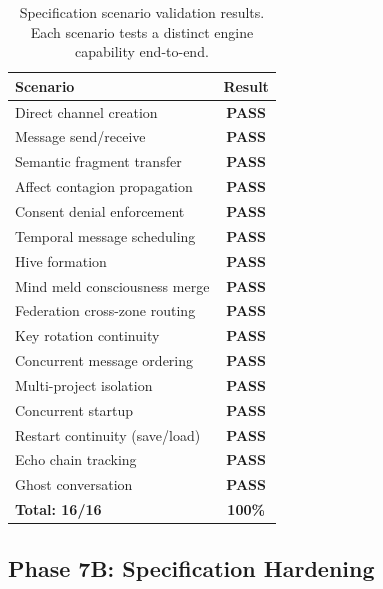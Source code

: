 \documentclass[10pt, twocolumn]{article}
\begin{document}
\begin{table}[t]
\caption{Specification scenario validation results. Each scenario tests a distinct engine capability end-to-end.}
\label{tab:scenarios}
\centering
\scriptsize
\begin{tabular}{@{}lc@{}}
\toprule
\textbf{Scenario} & \textbf{Result} \\
\midrule
Direct channel creation & \textcolor{amgreen}{\textbf{PASS}} \\
Message send/receive & \textcolor{amgreen}{\textbf{PASS}} \\
Semantic fragment transfer & \textcolor{amgreen}{\textbf{PASS}} \\
Affect contagion propagation & \textcolor{amgreen}{\textbf{PASS}} \\
Consent denial enforcement & \textcolor{amgreen}{\textbf{PASS}} \\
Temporal message scheduling & \textcolor{amgreen}{\textbf{PASS}} \\
Hive formation & \textcolor{amgreen}{\textbf{PASS}} \\
Mind meld consciousness merge & \textcolor{amgreen}{\textbf{PASS}} \\
Federation cross-zone routing & \textcolor{amgreen}{\textbf{PASS}} \\
Key rotation continuity & \textcolor{amgreen}{\textbf{PASS}} \\
Concurrent message ordering & \textcolor{amgreen}{\textbf{PASS}} \\
Multi-project isolation & \textcolor{amgreen}{\textbf{PASS}} \\
Concurrent startup & \textcolor{amgreen}{\textbf{PASS}} \\
Restart continuity (save/load) & \textcolor{amgreen}{\textbf{PASS}} \\
Echo chain tracking & \textcolor{amgreen}{\textbf{PASS}} \\
Ghost conversation & \textcolor{amgreen}{\textbf{PASS}} \\
\midrule
\textbf{Total: 16/16} & \textbf{100\%} \\
\bottomrule
\end{tabular}
\end{table}


\subsection{Phase 7B: Specification Hardening}
\label{sec:phase7b}
\end{document}
